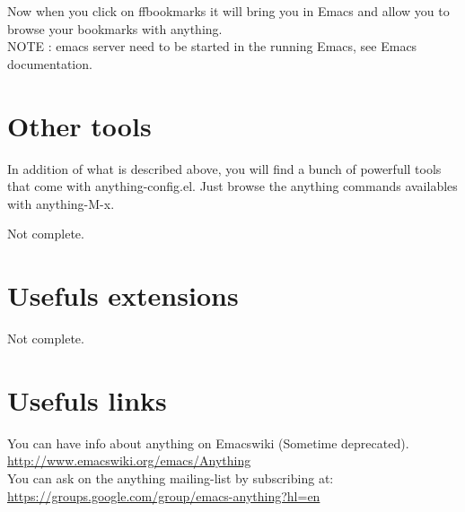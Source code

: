 \documentclass[a4paper,11pt]{article}
\begin{document}
Now when you click on ffbookmarks it will bring you in Emacs and allow
you to browse your bookmarks with anything.
\\
NOTE : emacs server need to be started in the running Emacs, see Emacs
documentation.

\section{Other tools}
\label{sec:other-tools}

In addition of what is described above, you will find a bunch of powerfull tools that come with anything-config.el.
Just browse the anything commands availables with anything-M-x.

Not complete.
\section{Usefuls extensions}
\label{sec:usefuls-extensions}
Not complete.

\section{Usefuls links}
\label{sec:usefuls-links}

You can have info about anything on Emacswiki (Sometime deprecated).\\
\url{http://www.emacswiki.org/emacs/Anything}\\

You can ask on the anything mailing-list by subscribing at:\\
\url{https://groups.google.com/group/emacs-anything?hl=en}
\end{document}
